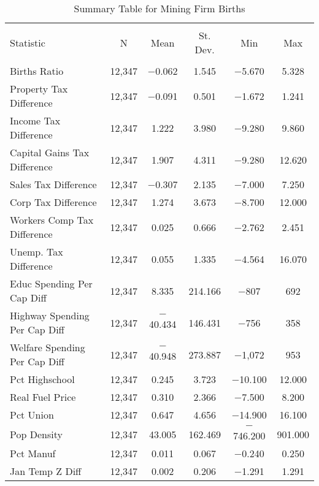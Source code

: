 
\begin{table}[!htbp] \centering 
  \caption{Summary Table for  Mining Firm Births} 
  \label{21summary} 
\begin{tabular}{@{\extracolsep{5pt}}lccccc} 
\\[-1.8ex]\hline 
\hline \\[-1.8ex] 
Statistic & \multicolumn{1}{c}{N} & \multicolumn{1}{c}{Mean} & \multicolumn{1}{c}{St. Dev.} & \multicolumn{1}{c}{Min} & \multicolumn{1}{c}{Max} \\ 
\hline \\[-1.8ex] 
Births Ratio & 12,347 & $-$0.062 & 1.545 & $-$5.670 & 5.328 \\ 
Property Tax Difference & 12,347 & $-$0.091 & 0.501 & $-$1.672 & 1.241 \\ 
Income Tax Difference & 12,347 & 1.222 & 3.980 & $-$9.280 & 9.860 \\ 
Capital Gains Tax Difference & 12,347 & 1.907 & 4.311 & $-$9.280 & 12.620 \\ 
Sales Tax Difference & 12,347 & $-$0.307 & 2.135 & $-$7.000 & 7.250 \\ 
Corp Tax Difference & 12,347 & 1.274 & 3.673 & $-$8.700 & 12.000 \\ 
Workers Comp Tax Difference & 12,347 & 0.025 & 0.666 & $-$2.762 & 2.451 \\ 
Unemp. Tax Difference & 12,347 & 0.055 & 1.335 & $-$4.564 & 16.070 \\ 
Educ Spending Per Cap Diff & 12,347 & 8.335 & 214.166 & $-$807 & 692 \\ 
Highway Spending Per Cap Diff & 12,347 & $-$40.434 & 146.431 & $-$756 & 358 \\ 
Welfare Spending Per Cap Diff & 12,347 & $-$40.948 & 273.887 & $-$1,072 & 953 \\ 
Pct Highschool & 12,347 & 0.245 & 3.723 & $-$10.100 & 12.000 \\ 
Real Fuel Price & 12,347 & 0.310 & 2.366 & $-$7.500 & 8.200 \\ 
Pct Union & 12,347 & 0.647 & 4.656 & $-$14.900 & 16.100 \\ 
Pop Density & 12,347 & 43.005 & 162.469 & $-$746.200 & 901.000 \\ 
Pct Manuf & 12,347 & 0.011 & 0.067 & $-$0.240 & 0.250 \\ 
Jan Temp Z Diff & 12,347 & 0.002 & 0.206 & $-$1.291 & 1.291 \\ 

\end{tabular}
\end{table}
